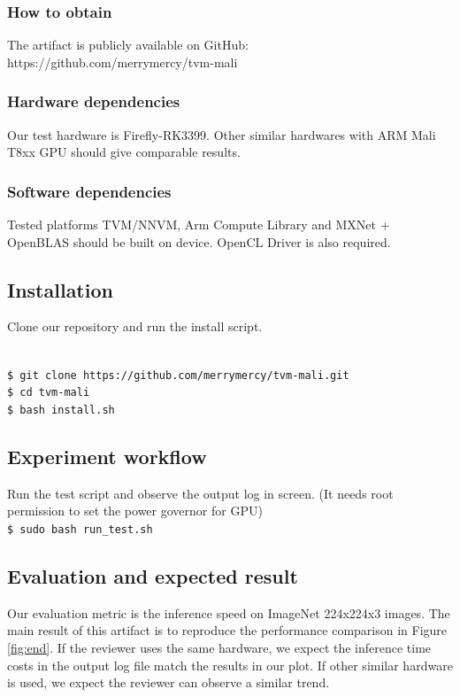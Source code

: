 \documentclass[sigplan]{acmart}
\newcommand{\shellcmd}[1]{\\\texttt{\$ #1}}
\begin{document}
{\subsubsection{How to obtain}
The artifact is publicly available on GitHub:  \\
{https://github.com/merrymercy/tvm-mali}

\subsubsection{Hardware dependencies}
Our test hardware is Firefly-RK3399.
Other similar hardwares with ARM Mali T8xx GPU should give comparable results.

\subsubsection{Software dependencies}
Tested platforms TVM/NNVM, Arm Compute Library and MXNet + OpenBLAS  should be built on device. OpenCL Driver is also required.

\subsection{Installation}
Clone our repository and run the install script.}
\shellcmd{git clone https://github.com/merrymercy/tvm-mali.git}
\shellcmd{cd tvm-mali}
\shellcmd{bash install.sh}

\subsection{Experiment workflow}
Run the test script and observe the output log in screen. (It needs root permission to set the power governor for GPU)
\shellcmd{sudo bash run\_test.sh}


\subsection{Evaluation and expected result}

Our evaluation metric is the inference speed on ImageNet 224x224x3 images. The main result 
of this artifact is to reproduce the performance comparison in Figure \ref{fig:end}.
If the reviewer uses the same hardware, we expect the inference time costs in the output log file match the results in our plot.
If other similar hardware is used, we expect the reviewer can observe a similar trend.
\end{document}
